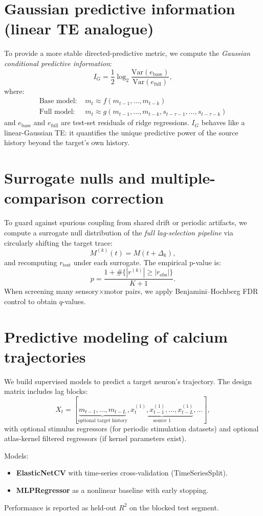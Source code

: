 \documentclass[11pt]{article}
\begin{document}
\section{Gaussian predictive information (linear TE analogue)}
To provide a more stable directed-predictive metric, we compute the \emph{Gaussian conditional predictive information}:
\[
I_G = \frac{1}{2}\log_2\frac{\mathrm{Var}(e_{\text{base}})}{\mathrm{Var}(e_{\text{full}})},
\]
where:
\begin{align*}
\text{Base model: } & m_t \approx f(m_{t-1},\dots,m_{t-k}) \\
\text{Full model: } & m_t \approx g(m_{t-1},\dots,m_{t-k}, s_{t-\tau-1},\dots,s_{t-\tau-k})
\end{align*}
and $e_{\text{base}}$ and $e_{\text{full}}$ are test-set residuals of ridge regressions. $I_G$ behaves like a linear-Gaussian TE: it quantifies the unique predictive power of the source history beyond the target's own history.

\section{Surrogate nulls and multiple-comparison correction}
To guard against spurious coupling from shared drift or periodic artifacts, we compute a surrogate null distribution of the \emph{full lag-selection pipeline} via circularly shifting the target trace:
\[
M^{(k)}(t)=M(t+\Delta_k),
\]
and recomputing $r_{\text{test}}$ under each surrogate. The empirical p-value is:
\[
p=\frac{1+\#\{|r^{(k)}|\ge |r_{\text{obs}}|\}}{K+1}.
\]
When screening many sensory$\times$motor pairs, we apply Benjamini--Hochberg FDR control to obtain $q$-values.

\section{Predictive modeling of calcium trajectories}
We build supervised models to predict a target neuron's trajectory. The design matrix includes lag blocks:
\[
X_t = [\underbrace{m_{t-1},\dots,m_{t-L}}_{\text{optional target history}},\underbrace{x^{(1)}_{t},x^{(1)}_{t-1},\dots,x^{(1)}_{t-L}}_{\text{source 1}}, \dots ],
\]
with optional stimulus regressors (for periodic stimulation datasets) and optional atlas-kernel filtered regressors (if kernel parameters exist).

Models:
\begin{itemize}
  \item \textbf{ElasticNetCV} with time-series cross-validation (TimeSeriesSplit).
  \item \textbf{MLPRegressor} as a nonlinear baseline with early stopping.
\end{itemize}
Performance is reported as held-out $R^2$ on the blocked test segment.
\end{document}

